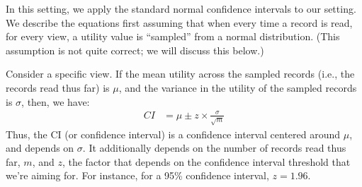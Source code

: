  In this setting,
we apply the standard normal confidence intervals to our setting. 
We describe the equations first assuming that
when every time a record is read, for every view,
a utility value is ``sampled''
from a normal distribution. (This assumption is not
quite correct; we will discuss this  below.)

Consider a specific view. 
If the mean utility across the sampled records 
(i.e., the records read thus far) is $\mu$,
and the variance in the utility of the sampled records
is $\sigma$, then, we have:
\begin{align}
CI & = \mu \pm z \times \frac{\sigma}{\sqrt{m}}
\end{align}
Thus, the CI (or confidence interval) is 
a confidence interval centered around $\mu$, 
and depends on $\sigma$. 
It additionally depends on the number of records
read thus far, $m$,
and $z$, the factor that depends on the confidence interval
threshold that we're aiming for.
For instance, for a 95\% confidence interval, $z = 1.96$.

